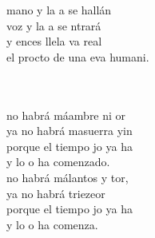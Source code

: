 \documentclass[12pt]{article}
\begin{document}
\begin{multicols*}{2}
\begin{cancion}%
	\begin{chorus}%
	 mano y la a se hallán\\
	 voz y la a se ntrará\\
	y ences llela va real\\
	el procto de una eva humani.\\
	\end{chorus}%
	\jump\\
	  \\
	no habrá máambre ni or\\
	ya no habrá masuerra yin\\
	porque el tiempo jo ya ha \\
	y lo o ha comenzado.\\
	no habrá málantos y tor, \\
	ya no habrá triezeor\\
	porque el tiempo jo ya ha \\
	y lo o ha comenza.\\
\end{cancion}%


\end{multicols*}
\end{document}
